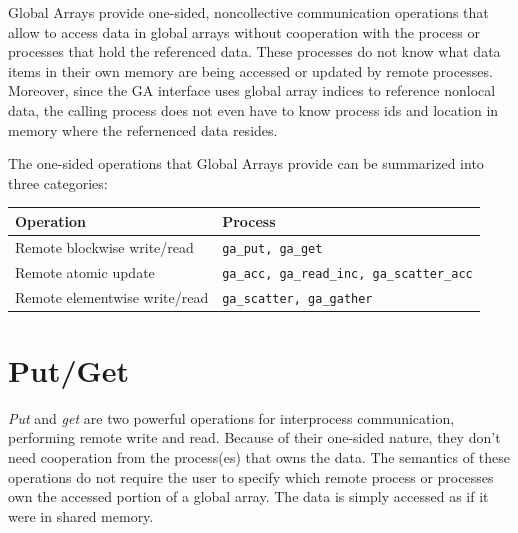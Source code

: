 Global Arrays provide one-sided, noncollective communication operations
that allow to access data in global arrays without cooperation with
the process or processes that hold the referenced data. These processes
do not know what data items in their own memory are being accessed
or updated by remote processes. Moreover, since the GA interface uses
global array indices to reference nonlocal data, the calling process
does not even have to know process ids and location in memory where
the refernenced data resides.

The one-sided operations that Global Arrays provide can be summarized
into three categories: 

\begin{tabular}{|>{\centering}p{4cm}|>{\centering}p{4cm}|}
\hline 
Operation & Process\tabularnewline
\hline
\hline 
Remote blockwise write/read & \texttt{ga\_put, ga\_get}\tabularnewline
\hline 
Remote atomic update & \texttt{ga\_acc, ga\_read\_inc, ga\_scatter\_acc}\tabularnewline
\hline 
Remote elementwise write/read & \texttt{ga\_scatter, ga\_gather}\tabularnewline
\hline
\end{tabular}


\section{Put/Get }

\emph{Put} and \emph{get} are two powerful operations for interprocess
communication, performing remote write and read. Because of their
one-sided nature, they don't need cooperation from the process(es)
that owns the data. The semantics of these operations do not require
the user to specify which remote process or processes own the accessed
portion of a global array. The data is simply accessed as if it were
in shared memory.

